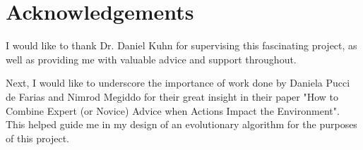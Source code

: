 \chapter*{Acknowledgements}

I would like to thank Dr. Daniel Kuhn for supervising this fascinating project, as well as providing me with valuable advice and support throughout.


Next, I would like to underscore the importance of work done by Daniela Pucci de Farias and Nimrod Megiddo for their great insight in their paper "How to Combine Expert (or Novice) Advice when Actions Impact the Environment". This helped guide me in my design of an evolutionary algorithm for the purposes of this project.

